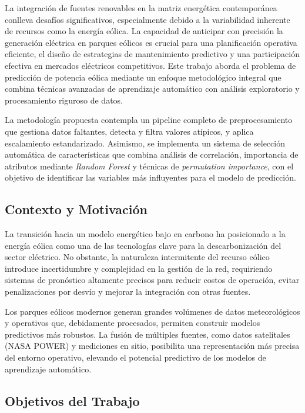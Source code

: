 \documentclass[conference]{IEEEtran}
\begin{document}
	La integración de fuentes renovables en la matriz energética contemporánea conlleva desafíos significativos, especialmente debido a la variabilidad inherente de recursos como la energía eólica. La capacidad de anticipar con precisión la generación eléctrica en parques eólicos es crucial para una planificación operativa eficiente, el diseño de estrategias de mantenimiento predictivo y una participación efectiva en mercados eléctricos competitivos. Este trabajo aborda el problema de predicción de potencia eólica mediante un enfoque metodológico integral que combina técnicas avanzadas de aprendizaje automático con análisis exploratorio y procesamiento riguroso de datos.
	
	La metodología propuesta contempla un pipeline completo de preprocesamiento que gestiona datos faltantes, detecta y filtra valores atípicos, y aplica escalamiento estandarizado. Asimismo, se implementa un sistema de selección automática de características que combina análisis de correlación, importancia de atributos mediante \textit{Random Forest} y técnicas de \textit{permutation importance}, con el objetivo de identificar las variables más influyentes para el modelo de predicción.
	
	\subsection{Contexto y Motivación}
	
	La transición hacia un modelo energético bajo en carbono ha posicionado a la energía eólica como una de las tecnologías clave para la descarbonización del sector eléctrico. No obstante, la naturaleza intermitente del recurso eólico introduce incertidumbre y complejidad en la gestión de la red, requiriendo sistemas de pronóstico altamente precisos para reducir costos de operación, evitar penalizaciones por desvío y mejorar la integración con otras fuentes.
	
	Los parques eólicos modernos generan grandes volúmenes de datos meteorológicos y operativos que, debidamente procesados, permiten construir modelos predictivos más robustos. La fusión de múltiples fuentes, como datos satelitales (NASA POWER) y mediciones en sitio, posibilita una representación más precisa del entorno operativo, elevando el potencial predictivo de los modelos de aprendizaje automático.
	
	\subsection{Objetivos del Trabajo}
	
\end{document}
